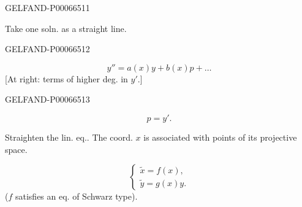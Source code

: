 \begin{GelfandAdjacentEvidence}{GELFAND-P000665}{11}


Take one soln. as a straight line.
\end{GelfandAdjacentEvidence}
\begin{GelfandAdjacentEvidence}{GELFAND-P000665}{12}

\[
y''=a(x)y+b(x)p+\ldots
\]
[At right: terms of higher deg. in \(y'\).]
\end{GelfandAdjacentEvidence}
\begin{GelfandAdjacentEvidence}{GELFAND-P000665}{13}

\[
p=y'.
\]

Straighten the lin. eq.. The coord. \(x\) is associated with points of its projective space.
\end{GelfandAdjacentEvidence}

\[
\begin{cases}
\tilde x=f(x),\\
\tilde y=g(x)y.
\end{cases}
\]
(\(f\) satisfies an eq. of Schwarz type).


